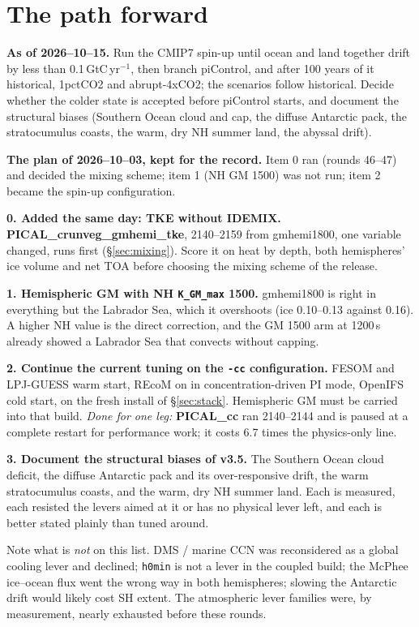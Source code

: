\documentclass[10pt]{article}
\begin{document}
\section{The path forward}\label{sec:forward}

\textbf{As of 2026--10--15.} Run the CMIP7 spin-up until ocean and land together drift by less than
0.1\,GtC\,yr$^{-1}$, then branch piControl, and after 100 years of it historical, 1pctCO2 and
abrupt-4xCO2; the scenarios follow historical. Decide whether the colder state is accepted before
piControl starts, and document the structural biases (Southern Ocean cloud and cap, the diffuse
Antarctic pack, the stratocumulus coasts, the warm, dry NH summer land, the abyssal drift).

\medskip
\textbf{The plan of 2026--10--03, kept for the record.} Item 0 ran (rounds 46--47) and decided the
mixing scheme; item 1 (NH GM 1500) was not run; item 2 became the spin-up configuration.

\textbf{0. Added the same day: TKE without IDEMIX.} \textbf{PICAL\_crunveg\_gmhemi\_tke}, 2140--2159
from gmhemi1800, one variable changed, runs first (\S\ref{sec:mixing}). Score it on heat by depth,
both hemispheres' ice volume and net TOA before choosing the mixing scheme of the release.

\textbf{1. Hemispheric GM with NH \texttt{K\_GM\_max} 1500.} gmhemi1800 is right in everything but
the Labrador Sea, which it overshoots (ice 0.10--0.13 against 0.16). A higher NH value is the
direct correction, and the GM 1500 arm at 1200\,s already showed a Labrador Sea that convects
without capping.

\textbf{2. Continue the current tuning on the \texttt{-cc} configuration.} FESOM and LPJ-GUESS warm
start, REcoM on in concentration-driven PI mode, OpenIFS cold start, on the fresh install of
\S\ref{sec:stack}. Hemispheric GM must be carried into that build. \emph{Done for one leg:}
\textbf{PICAL\_cc} ran 2140--2144 and is paused at a complete restart for performance work; it costs
6.7 times the physics-only line.

\textbf{3. Document the structural biases of v3.5.} The Southern Ocean cloud deficit, the diffuse
Antarctic pack and its over-responsive drift, the warm stratocumulus coasts, and the warm, dry NH
summer land. Each is measured, each resisted the levers aimed at it or has no physical lever left,
and each is better stated plainly than tuned around.

\medskip
Note what is \emph{not} on this list. DMS / marine CCN was reconsidered as a global cooling lever
and declined; \texttt{h0min} is not a lever in the coupled build; the McPhee ice--ocean flux went
the wrong way in both hemispheres; slowing the Antarctic drift would likely cost SH extent. The
atmospheric lever families were, by measurement, nearly exhausted before these rounds.
\end{document}
